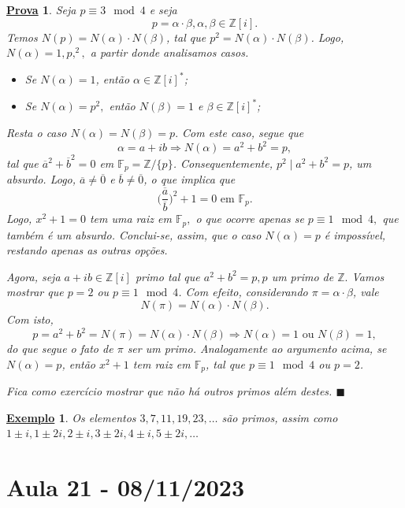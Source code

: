 \documentclass{article}
\newtheorem{example}{\underline{Exemplo}}
\newtheorem*{proof*}{\underline{Prova}}
\renewcommand\qedsymbol{$\blacksquare$}
\begin{document}
\begin{proof*}
  Seja \(p\equiv 3\mod 4\) e seja 
  \[
    p = \alpha \cdot \beta , \alpha , \beta \in \mathbb{Z}[i].
  \]
  Temos \(N(p) = N(\alpha )\cdot N(\beta )\), tal que \(p^{2} = N(\alpha )\cdot N(\beta )\). Logo,
  \(N(\alpha ) = 1, p, ^{2},\) a partir donde analisamos casos.
  \begin{itemize}
    \item Se \(N(\alpha ) = 1\), então \(\alpha \in \mathbb{Z}[i]^{*}\);
    \item Se \(N(\alpha ) = p^{2},\) então \(N(\beta ) = 1\) e \(\beta \in \mathbb{Z}[i]^{*}\);
  \end{itemize}
  Resta o caso \(N(\alpha ) = N(\beta ) = p.\) Com este caso, segue que 
  \[
    \alpha = a + ib \Rightarrow N(\alpha ) = a^{2} + b^{2} = p,
  \]
  tal que \(\overline{a}^{2} + \overline{b}^{2} = 0\) em \(\mathbb{F}_{p} = \mathbb{Z}/\{p\}\). Consequentemente,
  \(p^{2}\mid a^{2}+b^{2} = p\), um absurdo. Logo, \(\overline{a}\neq \overline{0}\) e \(\overline{b}\neq \overline{0}\), o que implica que 
  \[
    \biggl(\frac{\overline{a}}{\overline{b}}\biggr)^{2} + 1 = 0 \text{ em } \mathbb{F}_{p}.
  \]
  Logo, \(x^{2} + 1 = 0\) tem uma raiz em \(\mathbb{F}_{p},\) o que ocorre apenas se \(p\equiv 1 \mod 4,\) que também
  é um absurdo. Conclui-se, assim, que o caso \(N(\alpha ) = p\) é impossível, restando apenas as outras opções.

  Agora, seja \(a+ib\in \mathbb{Z}[i]\) primo tal que \(a^{2} + b^{2} = p, p\) um primo de \(\mathbb{Z}.\)
  Vamos mostrar que \(p = 2\) ou \(p\equiv 1\mod 4\). Com efeito, considerando \(\pi  = \alpha \cdot \beta \), vale 
  \[
    N(\pi ) = N(\alpha )\cdot N(\beta ).
  \]
  Com isto, 
  \[
    p = a^{2} + b^{2} = N(\pi) = N(\alpha )\cdot N(\beta ) \Rightarrow N(\alpha ) = 1 \text{ ou } N(\beta ) = 1,
  \]
  do que segue o fato de \(\pi \) ser um primo. Analogamente ao argumento acima, se \(N(\alpha ) = p\), então \(x^{2} + 1\) tem raiz em \(\mathbb{F}_{p}\),
  tal que \(p\equiv 1 \mod 4\) ou \(p = 2\).

  Fica como exercício mostrar que não há outros primos além destes. \qedsymbol
\end{proof*}
\begin{example}
  Os elementos \(3, 7, 11, 19, 23, \dotsc\) são primos, assim como \(1\pm i, 1\pm 2i, 2\pm i, 3\pm 2i, 4\pm i, 5\pm 2i, \dotsc\) 
\end{example}
\newpage

\section{Aula 21 - 08/11/2023}
\end{document}
